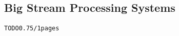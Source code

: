 \subsection{Big Stream Processing Systems} 
\label{sec:tut_systems}
\begin{alltt}TODO\scriptsize 0.75/1 pages
\end{alltt}